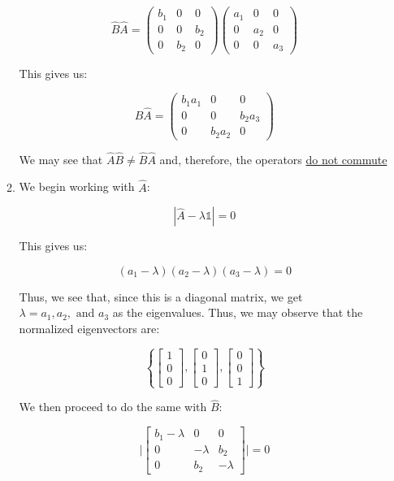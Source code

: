 \begin{enumerate}
\begin{enumerate}
        $$\hat{B}\hat{A}=\left( \begin{matrix} b_1 & 0 & 0\\ 0 & 0 & b_2\\ 0 & b_2 & 0\end{matrix} \right)\left( \begin{matrix} a_1 & 0 & 0\\ 0 & a_2 & 0\\ 0 & 0 & a_3\end{matrix} \right)$$

        This gives us:

        $$\hat{B}\hat{A}=\left( \begin{matrix} b_1a_1 & 0 & 0\\ 0 & 0 & b_2a_3\\ 0 & b_2a_2&0\end{matrix} \right)$$

        We may see that $\hat{A}\hat{B}\neq\hat{B}\hat{A}$ and, therefore, the operators \underline{do not commute}

      \item We begin working with $\hat{A}$:

        $$|\hat{A}-\lambda\mathbb{1}|=0$$

        This gives us:

        $$(a_1-\lambda)(a_2-\lambda)(a_3-\lambda)=0$$

        Thus, we see that, since this is a diagonal matrix, we get $\boxed{\lambda=a_1, a_2,\text{ and }a_3}$ as the eigenvalues. Thus, we may observe that the normalized eigenvectors are:

        $$\boxed{\left\{ \left[ \begin{matrix} 1\\0\\0\end{matrix} \right], \left[ \begin{matrix}0\\1\\0\end{matrix} \right],\left[ \begin{matrix} 0\\0\\1\end{matrix} \right] \right\}}$$

        We then proceed to do the same with $\hat{B}$:

        $$\Big|\left[ \begin{matrix} b_1-\lambda & 0 & 0\\ 0 & -\lambda & b_2\\0 & b_2 & -\lambda\end{matrix} \right]\Big|=0$$


\end{enumerate}
\end{enumerate}
